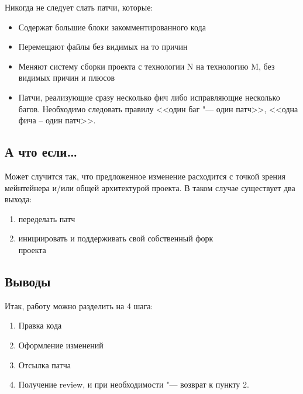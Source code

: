 \documentclass[10pt, a5paper]{article}
\begin{document}
Никогда не следует слать патчи, которые:

\begin{itemize}
    \item     Содержат большие блоки закомментированного кода
    \item Перемещают файлы без видимых на то причин
    \item Меняют систему сборки проекта с технологии N на технологию M, без видимых причин и плюсов
    \item Патчи, реализующие сразу несколько фич либо исправляющие несколько багов. Необходимо следовать правилу <<один баг "--- один патч>>, <<одна фича – один патч>>.
\end{itemize}

\subsection*{А что если\ldots}

Может случится так, что предложенное изменение расходится с точкой зрения мейнтейнера и/или общей архитектурой проекта. В таком случае существует два выхода:

\begin{enumerate}
\item    переделать патч
\item    инициировать и поддерживать свой собственный форк \\ проекта
\end{enumerate}

\subsection*{Выводы}

Итак, работу можно разделить на 4 шага:

\begin{enumerate}
\item    Правка кода
\item Оформление изменений
\item Отсылка патча
\item Получение review, и при необходимости "--- возврат к пункту 2.
\end{enumerate}
\end{document}
